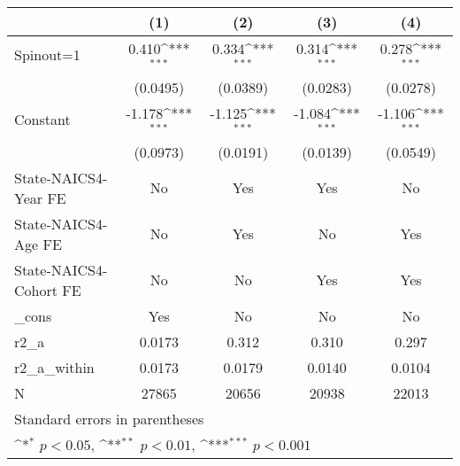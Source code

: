 {
\def\sym#1{\ifmmode^{#1}\else\(^{#1}\)\fi}
\begin{tabular}{l*{4}{c}}
\hline\hline
                    &\multicolumn{1}{c}{(1)}         &\multicolumn{1}{c}{(2)}         &\multicolumn{1}{c}{(3)}         &\multicolumn{1}{c}{(4)}         \\
\hline
Spinout=1           &       0.410\sym{***}&       0.334\sym{***}&       0.314\sym{***}&       0.278\sym{***}\\
                    &    (0.0495)         &    (0.0389)         &    (0.0283)         &    (0.0278)         \\
[1em]
Constant            &      -1.178\sym{***}&      -1.125\sym{***}&      -1.084\sym{***}&      -1.106\sym{***}\\
                    &    (0.0973)         &    (0.0191)         &    (0.0139)         &    (0.0549)         \\
[1em]
State-NAICS4-Year FE&          No         &         Yes         &         Yes         &          No         \\
[1em]
State-NAICS4-Age FE &          No         &         Yes         &          No         &         Yes         \\
[1em]
State-NAICS4-Cohort FE&          No         &          No         &         Yes         &         Yes         \\
[1em]
\_cons              &         Yes         &          No         &          No         &          No         \\
\hline
r2\_a                &      0.0173         &       0.312         &       0.310         &       0.297         \\
r2\_a\_within         &      0.0173         &      0.0179         &      0.0140         &      0.0104         \\
N                   &       27865         &       20656         &       20938         &       22013         \\
\hline\hline
\multicolumn{5}{l}{\footnotesize Standard errors in parentheses}\\
\multicolumn{5}{l}{\footnotesize \sym{*} \(p<0.05\), \sym{**} \(p<0.01\), \sym{***} \(p<0.001\)}\\
\end{tabular}
}
